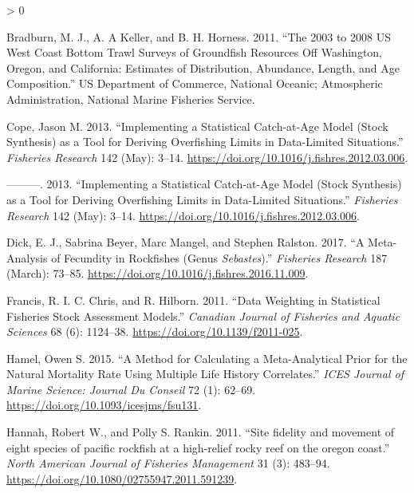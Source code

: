 \documentclass[11pt,
  english,
  a4paper,
]{article}
\newlength{\cslhangindent}
\newenvironment{CSLReferences}[2] %
 {%
  \setlength{\parindent}{0pt}
  \ifodd #1 \everypar{\setlength{\hangindent}{\cslhangindent}}\ignorespaces\fi
  \ifnum #2 > 0
  \setlength{\parskip}{#2\baselineskip}
  \fi
 }%
 {}
\begin{document}
\leavevmode\tagmcend\tagstructend


\hypertarget{refs}{}
\begin{CSLReferences}{1}{0}
\leavevmode\hypertarget{ref-bradburn_2003_2011}{}%
Bradburn, M. J., A. A Keller, and B. H. Horness. 2011. {``The 2003 to 2008 {US} {West} {Coast} Bottom Trawl Surveys of Groundfish Resources Off {Washington}, {Oregon}, and {California}: Estimates of Distribution, Abundance, Length, and Age Composition.''} US Department of Commerce, National Oceanic; Atmospheric Administration, National Marine Fisheries Service.

\leavevmode\hypertarget{ref-cope_implementing_2013}{}%
Cope, Jason M. 2013. {``Implementing a Statistical Catch-at-Age Model (Stock Synthesis) as a Tool for Deriving Overfishing Limits in Data-Limited Situations.''} \emph{Fisheries Research} 142 (May): 3--14. \url{https://doi.org/10.1016/j.fishres.2012.03.006}.

\leavevmode\hypertarget{ref-cope_implementing_2013}{}%
---------. 2013. {``Implementing a Statistical Catch-at-Age Model (Stock Synthesis) as a Tool for Deriving Overfishing Limits in Data-Limited Situations.''} \emph{Fisheries Research} 142 (May): 3--14. \url{https://doi.org/10.1016/j.fishres.2012.03.006}.

\leavevmode\hypertarget{ref-dick_meta-analysis_2017}{}%
Dick, E. J., Sabrina Beyer, Marc Mangel, and Stephen Ralston. 2017. {``A Meta-Analysis of Fecundity in Rockfishes (Genus \emph{Sebastes}).''} \emph{Fisheries Research} 187 (March): 73--85. \url{https://doi.org/10.1016/j.fishres.2016.11.009}.

\leavevmode\hypertarget{ref-francis_data_2011}{}%
Francis, R. I. C. Chris, and R. Hilborn. 2011. {``Data Weighting in Statistical Fisheries Stock Assessment Models.''} \emph{Canadian Journal of Fisheries and Aquatic Sciences} 68 (6): 1124--38. \url{https://doi.org/10.1139/f2011-025}.

\leavevmode\hypertarget{ref-hamel_method_2015}{}%
Hamel, Owen S. 2015. {``A Method for Calculating a Meta-Analytical Prior for the Natural Mortality Rate Using Multiple Life History Correlates.''} \emph{ICES Journal of Marine Science: Journal Du Conseil} 72 (1): 62--69. \url{https://doi.org/10.1093/icesjms/fsu131}.

\leavevmode\hypertarget{ref-Hannah2011}{}%
Hannah, Robert W., and Polly S. Rankin. 2011. {``{Site fidelity and movement of eight species of pacific rockfish at a high-relief rocky reef on the oregon coast}.''} \emph{North American Journal of Fisheries Management} 31 (3): 483--94. \url{https://doi.org/10.1080/02755947.2011.591239}.


\end{CSLReferences}
\end{document}
